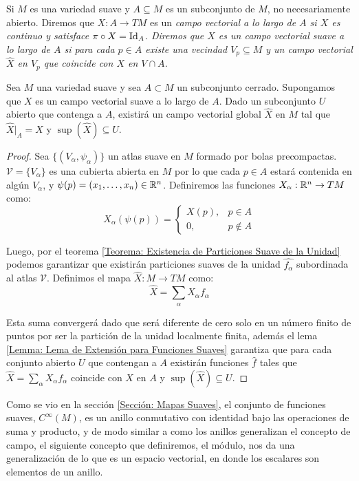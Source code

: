 \begin{definition}
	Si $M$ es una variedad suave y $A \subseteq M$ es un subconjunto de $M$, no necesariamente abierto. Diremos que $X: A \to TM$ es un \it{campo vectorial a lo largo de $A$} si $X$ es continuo y satisface $\pi \circ X = \mathrm{Id}_{A}$. Diremos que $X$ es un \it{campo vectorial suave a lo largo de $A$} si para cada $p \in A$ existe una vecindad $V_p \subseteq M$ y un campo vectorial $\hat{X}$ en $V_p$ que coincide con $X$ en $V \cap A$.
\end{definition}

\begin{lemma}
	Sea $M$ una variedad suave y sea $A \subset M$ un subconjunto cerrado. Supongamos que $X$ es un campo vectorial suave a lo largo de $A$. Dado un subconjunto $U$ abierto que contenga a $A$, existirá un campo vectorial global $\hat{X}$ en $M$ tal que $\hat{X}|_{A} = X$ y $\sup(\hat{X}) \subseteq U$.
\end{lemma}

\begin{proof}
	Sea $\{(V_\alpha,\psi_\alpha)\}$ un atlas suave en $M$ formado por bolas precompactas. $\mathcal{V}=\{V_\alpha\}$ es una cubierta abierta en $M$ por lo que cada $p \in A$ estará contenida en algún $V_\alpha$, y $\psi(p) = (x_1,\dots,x_n) \in \mathbb{R}^n$. Definiremos las funciones $X_\alpha: \mathbb{R}^n \to TM$ como:
	\[
		X_{\alpha}(\psi(p)) = \begin{cases}
			X(p), & p \in A    \\
			0,    & p \notin A
		\end{cases}
	\]

	Luego, por el teorema \ref{Teorema: Existencia de Particiones Suave de la Unidad} podemos garantizar que existirán particiones suaves de la unidad $\hat{f_\alpha}$ subordinada al atlas $\mathcal{V}$. Definimos el mapa $\hat{X}: M \to TM$ como:
	\[
		\hat{X} = \sum_{\alpha} X_{\alpha}f_\alpha
	\]

	Esta suma convergerá dado que será diferente de cero solo en un número finito de puntos por ser la partición de la unidad localmente finita, además el lema \ref{Lemma: Lema de Extensión para Funciones Suaves} garantiza que para cada conjunto abierto $U$ que contengan a $A$ existirán funciones $\hat{f}$ tales que $\hat{X} = \sum_\alpha  X_\alpha f_\alpha$ coincide con $X$ en $A$ y $\sup(\hat{X}) \subseteq U$.
\end{proof}

Como se vio en la sección \ref{Sección: Mapas Suaves}, el conjunto de funciones suaves, $C^{\infty}(M)$, es un anillo conmutativo con identidad bajo las operaciones de suma y producto, y de modo similar a como los anillos generalizan el concepto de campo, el siguiente concepto que definiremos, el módulo, nos da una generalización de lo que es un espacio vectorial, en donde los escalares son elementos de un anillo.

